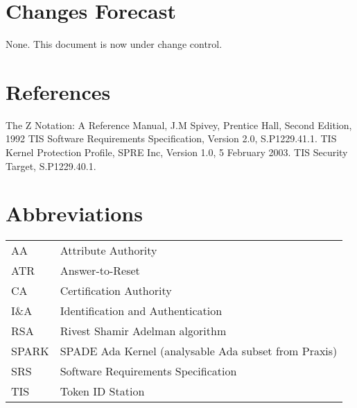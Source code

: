 \documentclass{pxcsdoc}
\begin{document}
\section*{Changes Forecast}

None. This document is now under change control.

\section*{References}
\begin{thebibliography}{99}
The Z Notation: A Reference Manual, J.M Spivey, Prentice Hall, Second Edition,
1992
TIS Software Requirements Specification, Version 2.0, S.P1229.41.1.
TIS Kernel Protection Profile, SPRE Inc, Version 1.0, 5 February 2003.
TIS Security Target, S.P1229.40.1.
\end{thebibliography}

\section*{Abbreviations}
{\footnotesize\begin{tabular}{ll}
AA           & Attribute Authority \\
ATR          & Answer-to-Reset \\
CA           & Certification Authority \\
I\&A         & Identification and Authentication \\
RSA          & Rivest Shamir Adelman algorithm \\   
SPARK        & SPADE Ada Kernel (analysable Ada subset from Praxis) \\
SRS          & Software Requirements Specification \\
TIS          & Token ID Station \\
\end{tabular}}



\tableofcontents













\end{document}
